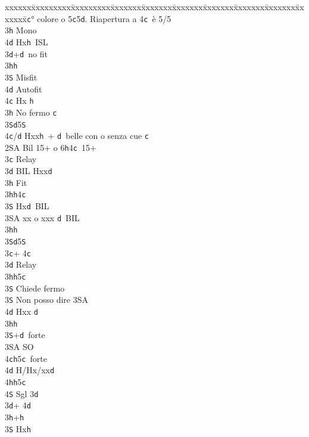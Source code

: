 \documentclass[a4paper,italian]{article}
\newcommand{\BS}{\small{\texttt{S}}}
\newcommand{\BC}{\small{\texttt{c}}}
\newcommand{\BD}{\small{\texttt{d}}}
\newcommand{\BH}{\small{\texttt{h}}}
\newenvironment{bidtable}
{\begin{tabbing}

    xxxxxx\=xxxxxxxxx\=xxxxxxxxx\=xxxxxxx\=xxxxxxx\=xxxxxxx\=xxxxxxx\=xxxxxxx\=xxxxxxx\=xxxxxxx\=\kill}
{\end{tabbing} }%
\begin{document}
\begin{multicols}{2}
\begin{bidtable}
        3\BC {}° colore o 5\BC 5\BD . Riapertura a 4\BC\ è 5/5\+\\
        3\BH \> Mono\+\\
        4\BD \> Hx\BH\ ISL\-\-\\
        3\BD {}+\BD\ no fit\+\\
        3\BH {}\BH \+\\
        3\BS \> Misfit\\
        4\BD \> Autofit\\
        4\BC \> Hx \BH \-\-\\
        3\BH \> No fermo \BC \\
        3\BS {}\BD 5\BS \\
        4\BC/\BD \> Hxx\BH\ + \BD\ belle con o senza cue \BC\-\\
        2\small{SA} \> Bil 15+ o 6\BH 4\BC\ 15+\+\\
        3\BC \> Relay\+\\
        3\BD \> BIL Hxx\BD \+\\
        3\BH \> Fit\-\\
        3\BH {}\BH 4\BC \\
        3\BS \> Hx\BD\ BIL\\
        3\small{SA} \> xx o xxx \BD\ BIL\-\\
        3\BH {}\BH \\
        3\BS {}\BD 5\BS \-\\
        3\BC {}+ 4\BC \+\\
        3\BD \> Relay\+\\
        3\BH {}\BH 5\BC \+\\
        3\BS \> Chiede fermo\-\\
        3\BS \> Non posso dire 3\small{SA}\\
        4\BD \> Hxx \BD \-\\
        3\BH {}\BH \\
        3\BS {}+\BD\ forte\+\\
        3\small{SA} \> SO\\
        4\BC {}\BH 5\BC\ forte\\
        4\BD \> H/Hx/xx\BD \\
        4\BH {}\BH 5\BC \\
        4\BS \> Sgl 3\BD \-\-\\
        3\BD {}+ 4\BD \+\\
        3\BH {}+\BH \\
        3\BS \> Hx\BH \-\\

\end{bidtable}
\end{multicols}
\end{document}
